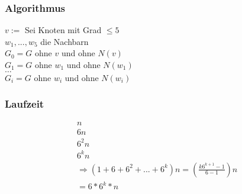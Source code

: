 \subsubsection{Algorithmus}
$v:=$ Sei Knoten mit Grad $\leq 5$\\
$w_1,...,w_5$ die Nachbarn\\
$G_0 = G$ ohne $v$ und ohne $N(v)$\\
$G_1 = G$ ohne $w_1$ und ohne $N(w_1)$\\
$\dots$\\
$G_i = G$ ohne $w_i$ und ohne $N(w_i)$\\
\subsubsection{Laufzeit}
\begin{align*}
&n\\
&6n\\
&6^2n\\
&6^kn\\
&\Rightarrow (1+6+6^2+...+6^k)n = (\frac{k6^{k+1}-1}{6-1})n\\
&=6*6^k*n\\
\end{align*}
